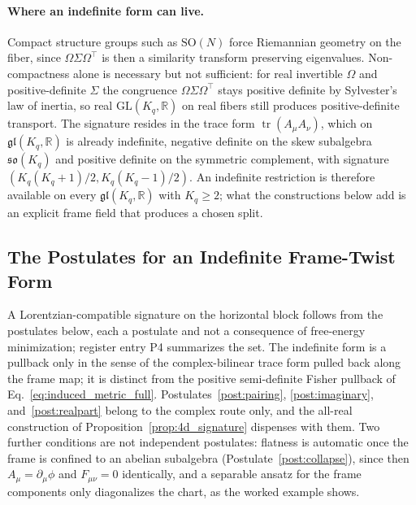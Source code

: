 \paragraph{Where an indefinite form can live.} Compact structure groups such as $\mathrm{SO}(N)$ force Riemannian geometry on the fiber, since $\Omega\Sigma\Omega^\top$ is then a similarity transform preserving eigenvalues. Non-compactness alone is necessary but not sufficient: for real invertible $\Omega$ and positive-definite $\Sigma$ the congruence $\Omega\Sigma\Omega^\top$ stays positive definite by Sylvester's law of inertia, so real $\mathrm{GL}(K_q,\mathbb{R})$ on real fibers still produces positive-definite transport. The signature resides in the trace form $\operatorname{tr}(A_\mu A_\nu)$, which on $\mathfrak{gl}(K_q,\mathbb{R})$ is already indefinite, negative definite on the skew subalgebra $\mathfrak{so}(K_q)$ and positive definite on the symmetric complement, with signature $(K_q(K_q+1)/2, K_q(K_q-1)/2)$. An indefinite restriction is therefore available on every $\mathfrak{gl}(K_q,\mathbb{R})$ with $K_q \ge 2$; what the constructions below add is an explicit frame field that produces a chosen split.

\subsection{The Postulates for an Indefinite Frame-Twist Form}

A Lorentzian-compatible signature on the horizontal block follows from the postulates below, each a postulate and not a consequence of free-energy minimization; register entry P4 summarizes the set. The indefinite form is a pullback only in the sense of the complex-bilinear trace form pulled back along the frame map; it is distinct from the positive semi-definite Fisher pullback of Eq.~\eqref{eq:induced_metric_full}. Postulates~\ref{post:pairing}, \ref{post:imaginary}, and~\ref{post:realpart} belong to the complex route only, and the all-real construction of Proposition~\ref{prop:4d_signature} dispenses with them. Two further conditions are not independent postulates: flatness is automatic once the frame is confined to an abelian subalgebra (Postulate~\ref{post:collapse}), since then $A_\mu = \partial_\mu\phi$ and $F_{\mu\nu} = 0$ identically, and a separable ansatz for the frame components only diagonalizes the chart, as the worked example shows.


